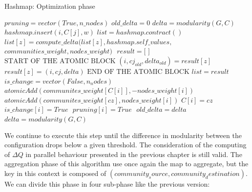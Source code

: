 \begin{algorithm}
	\caption{Hashmap: Optimization phase}\label{alg:hash-optimization}
	\begin{algorithmic}
		\State $pruning = vector(True, n\_nodes)$
		\State $old\_delta = 0$
		\State $delta = modularity(G,C)$
		\State $ $
		\State $ $
		\State $hashmap.insert(i,C[j],w)$
		\EndIf
		\EndFor 
		\State $list = hashmap.contract()$
		\State $ $
		\State $list[z] = compute\_delta(list[z], hashmap.self\_values,$ 
		\Statex[10] $communities\_weight, nodes\_weight)$
		\EndFor
		\State $ $
		\State $result = \text{[ ]}$
		\State $\text{START OF THE ATOMIC BLOCK} $
		\State $(i, cj_{old}, delta_{old}) = result[z]$
		\State $result[z] = (i, cj, delta)$ 
		\EndIf
		\State $\text{END OF THE ATOMIC BLOCK} $
		\EndFor
		\State $list = result$
		\State $ $
		\State $is\_change = vector(False, n_nodes)$
		\State $atomicAdd(communites\_weight[C[i]], -nodes\_weight[i])$
		\State $atomicAdd(communites\_weight[cz], nodes\_weight[i])$
		\State $C[i] = cz$
		\State $is\_change[i] = True$
		\EndIf
		\EndFor
		\State $ $
		\State $pruning[i] = True$
		\EndIf
		\EndFor
		\State $ $
		\State $old\_delta = delta$
		\State $delta = modularity(G,C)$
		\EndWhile
		\EndProcedure
	\end{algorithmic}
\end{algorithm}
\newpage
\noindent
We continue to execute this step until the difference in modularity between the configuration drops below a given threshold. The consideration of the computing of $\Delta Q$ in parallel behaviour presented in the previous chapter is still valid. 
The aggregation phase of this algorithm use once again the map to aggregate, but the key in this context is composed of $(community_source, community_destination)$. We can divide this phase in four sub-phase like the previous version:

